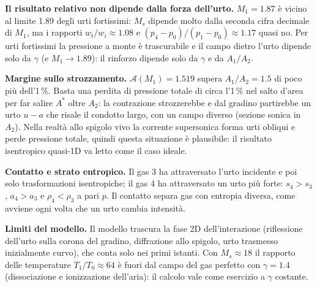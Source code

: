 \documentclass[11pt,a4paper]{article}
\newcommand{\uma}{u-a}
\newcommand{\Ms}{M_{s}}
\newcommand{\Ar}{\mathcal{A}}
\begin{document}
\textbf{Il risultato relativo non dipende dalla forza dell'urto.} $M_1=\num{1.87}$ è vicino al limite
\num{1.89} degli urti fortissimi: $\Ms$ dipende molto dalla seconda cifra decimale di $M_1$, ma i rapporti
$w_t/w_i\approx\num{1.08}$ e $(p_4-p_0)/(p_1-p_0)\approx\num{1.17}$ quasi no. Per urti fortissimi la
pressione a monte è trascurabile e il campo dietro l'urto dipende solo da $\gamma$ (e $M_1\to\num{1.89}$): il
rinforzo dipende solo da $\gamma$ e da $A_1/A_2$.

\textbf{Margine sullo strozzamento.} $\Ar(M_1)=\num{1.519}$ supera $A_1/A_2=\num{1.5}$ di poco più dell'1\,\%. Basta
una perdita di pressione totale di circa l'1\,\% nel salto d'area per far salire $A^*$ oltre $A_2$: la
contrazione strozzerebbe e dal gradino partirebbe un urto $\uma$ che risale il condotto largo, con un campo
diverso (sezione sonica in $A_2$). Nella realtà allo spigolo vivo la corrente supersonica forma urti obliqui
e perde pressione totale, quindi questa situazione è plausibile: il risultato isentropico quasi-1D va letto
come il caso ideale.

\textbf{Contatto e strato entropico.} Il gas 3 ha attraversato l'urto incidente e poi solo trasformazioni
isentropiche; il gas 4 ha attraversato un urto più forte: $s_4>s_3$, $a_4>a_3$ e $\rho_4<\rho_3$ a pari $p$. Il
contatto separa gas con entropia diversa, come avviene ogni volta che un urto cambia intensità.

\textbf{Limiti del modello.} Il modello trascura la fase 2D dell'interazione (riflessione dell'urto sulla corona
del gradino, diffrazione allo spigolo, urto trasmesso inizialmente curvo), che conta solo nei primi istanti. Con
$\Ms\approx18$ il rapporto delle temperature $T_1/T_0\approx64$ è fuori dal campo del gas perfetto con $\gamma=\num{1.4}$
(dissociazione e ionizzazione dell'aria): il calcolo vale come esercizio a $\gamma$ costante.
\end{document}
